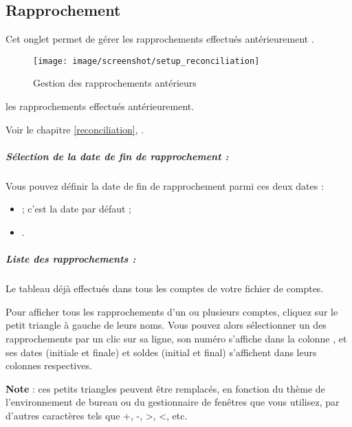 \subsection{Rapprochement\label{setup-operations-reconciliation}}

Cet onglet permet de gérer \ifIllustration les rapprochements effectués antérieurement . 

\begin{figure}[htb]
\begin{center}
\texttt{[image: image/screenshot/setup\_reconciliation]}
\end{center}
\caption{Gestion des rapprochements antérieurs}
\label{setup-reconciliation-img}
\end{figure}
\else les rapprochements effectués antérieurement.
\fi

Voir le chapitre \vref{reconciliation}, . 


\subparagraph{Sélection de la date de fin de rapprochement :\label{setup-operations-reconciliation-date}}

Vous pouvez définir la date de fin de rapprochement
 parmi ces deux dates :
\begin{itemize}
	\item {} ; c'est la date par défaut ;
	\item {}.
\end{itemize}


\subparagraph{Liste des rapprochements :}

Le tableau  déjà effectués dans tous les comptes de votre fichier de comptes. 

Pour afficher tous les rapprochements d'un ou plusieurs comptes, cliquez sur le petit triangle à gauche de leurs noms. Vous pouvez alors sélectionner un des rapprochements par un clic sur sa ligne, son numéro s'affiche dans la colonne , et ses dates (initiale et finale) et soldes (initial et final) s'affichent dans leurs colonnes respectives.

\textbf{Note} : ces petits triangles peuvent être remplacés, en fonction du thème de l'environnement de bureau ou du gestionnaire de fenêtres que vous utilisez, par d'autres caractères tels que +, -, >, <, etc.

